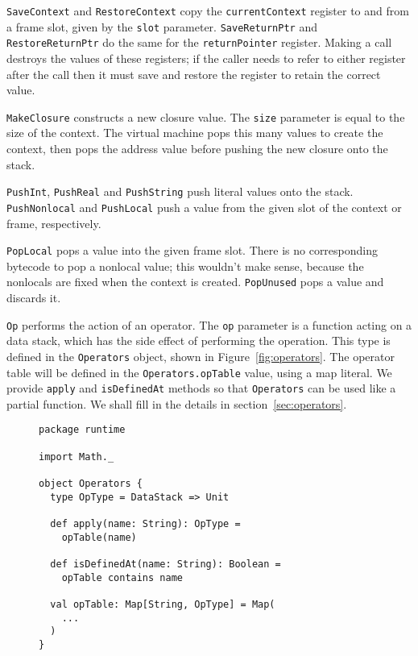 \verb!SaveContext! and \verb!RestoreContext!
copy the \verb!currentContext! register to and from a frame slot,
given by the \verb!slot! parameter.
\verb!SaveReturnPtr! and \verb!RestoreReturnPtr! do the same for the
\verb!returnPointer! register.
Making a call destroys the values of these registers;
if the caller needs to refer to either register after the call
then it must save and restore the register to retain the correct value.

\verb!MakeClosure! constructs a new closure value.
The \verb!size! parameter is equal to the size of the context.
The virtual machine pops this many values to create the context,
then pops the address value before pushing the new closure onto the stack.

\verb!PushInt!, \verb!PushReal! and \verb!PushString!
push literal values onto the stack.
\verb!PushNonlocal! and \verb!PushLocal! push
a value from the given slot of the context or frame, respectively.

\verb!PopLocal! pops a value into the given frame slot.
There is no corresponding bytecode to pop a nonlocal value;
this wouldn't make sense, because
the nonlocals are fixed when the context is created.
\verb!PopUnused! pops a value and discards it.

\verb!Op! performs the action of an operator.
The \verb!op! parameter is a function acting on a data stack,
which has the side effect of performing the operation.
This type is defined in the \verb!Operators! object,
shown in Figure~\ref{fig:operators}.
The operator table will be defined in the \verb!Operators.opTable! value,
using a map literal.
We provide \verb!apply! and \verb!isDefinedAt! methods so that
\verb!Operators! can be used like a partial function.
We shall fill in the details in section~\ref{sec:operators}.

\begin{figure}
\begin{verbatim}
package runtime

import Math._

object Operators {
  type OpType = DataStack => Unit

  def apply(name: String): OpType =
    opTable(name)

  def isDefinedAt(name: String): Boolean =
    opTable contains name

  val opTable: Map[String, OpType] = Map(
    ...
  )
}
\end{verbatim}
\getcaption
\end{figure}

